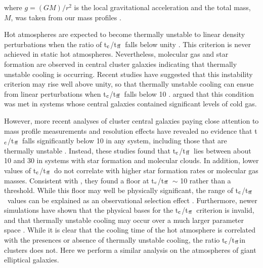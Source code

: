 \documentclass[apjl]{emulateapj}
\newcommand{\tctff}{{t$_{\rm c}$/t$_{\rm ff}$}}
\begin{document}
where $g = (G M)/r^2$ is the local gravitational acceleration and the total mass, $M$, was taken from our mass profiles \citep{Babyk:17prof}. {

Hot atmospheres are expected to become thermally unstable to linear density perturbations when the ratio of \tctff\ falls below unity \citep{Nulsen:86, Pizzolato:05, McCourt:12}. This criterion is never achieved in static hot atmospheres.  Nevertheless, molecular gas and star formation are observed in central cluster galaxies indicating that thermally unstable cooling is occurring.  Recent studies have suggested that this instability criterion may rise well above unity, so that thermally unstable cooling can ensue from linear perturbations when \tctff\ falls below 10 \citep{Sharma:12, McCourt:12, Gaspari:13, Li:15, Voit:15a}.  \citet{McCourt:12} argued that this condition was met in systems whose central galaxies contained significant levels of cold gas.   

However, more recent analyses of cluster central galaxies paying close attention to mass profile measurements and resolution effects  have revealed no evidence that \tctff\ falls significantly below 10 in any system, including those that are  thermally unstable \citep{McNamara:16, Hogan:17a, Pulido:17}.  Instead,  these studies found that \tctff\ lies between about 10 and 30 in systems with star formation and molecular clouds.  In addition, lower values of \tctff\  do not correlate with higher star formation rates or molecular gas masses. Consistent with \citet{Voit:15}, they found a floor at \tctff\ $\sim$ 10 rather than a threshold. While this floor may well be physically significant, the range of \tctff\ values can be explained as an observational selection effect \citep{Hogan:17}. Furthermore, newer simulations have shown that the physical bases for the \tctff\ criterion is invalid, and that thermally unstable cooling may occur over a much larger parameter space \citep{Sharma:16}. While it is clear that the cooling time of the hot atmosphere is correlated with the presences or absence of thermally unstable cooling, the ratio \tctff  in clusters does not.  Here we perform a similar analysis on the atmospheres of giant elliptical galaxies.


}
\end{document}
